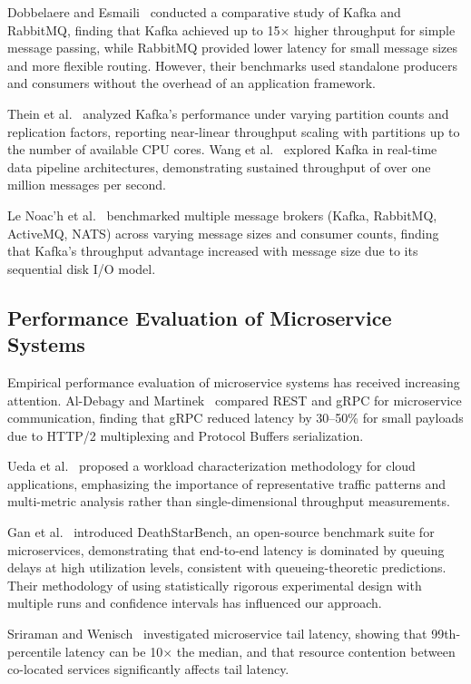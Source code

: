 \documentclass[journal]{IEEEtran}
\begin{document}
Dobbelaere and Esmaili~\cite{dobbelaere2017kafka} conducted a comparative study of Kafka and RabbitMQ, finding that Kafka achieved up to 15$\times$ higher throughput for simple message passing, while RabbitMQ provided lower latency for small message sizes and more flexible routing. However, their benchmarks used standalone producers and consumers without the overhead of an application framework.

Thein et al.~\cite{thein2014apache} analyzed Kafka's performance under varying partition counts and replication factors, reporting near-linear throughput scaling with partitions up to the number of available CPU cores. Wang et al.~\cite{wang2015building} explored Kafka in real-time data pipeline architectures, demonstrating sustained throughput of over one million messages per second.

Le Noac'h et al.~\cite{lenoach2017performance} benchmarked multiple message brokers (Kafka, RabbitMQ, ActiveMQ, NATS) across varying message sizes and consumer counts, finding that Kafka's throughput advantage increased with message size due to its sequential disk I/O model.

\subsection{Performance Evaluation of Microservice Systems}
\label{subsec:rw_performance}

Empirical performance evaluation of microservice systems has received increasing attention. Al-Debagy and Martinek~\cite{al2016comparison} compared REST and gRPC for microservice communication, finding that gRPC reduced latency by 30--50\% for small payloads due to HTTP/2 multiplexing and Protocol Buffers serialization.

Ueda et al.~\cite{ueda2016workload} proposed a workload characterization methodology for cloud applications, emphasizing the importance of representative traffic patterns and multi-metric analysis rather than single-dimensional throughput measurements.

Gan et al.~\cite{gan2019open} introduced DeathStarBench, an open-source benchmark suite for microservices, demonstrating that end-to-end latency is dominated by queuing delays at high utilization levels, consistent with queueing-theoretic predictions. Their methodology of using statistically rigorous experimental design with multiple runs and confidence intervals has influenced our approach.

Sriraman and Wenisch~\cite{sriraman2018mutune} investigated microservice tail latency, showing that 99th-percentile latency can be 10$\times$ the median, and that resource contention between co-located services significantly affects tail latency.
\end{document}
